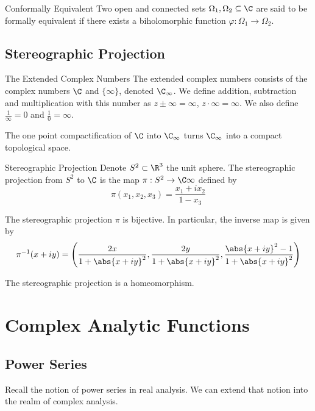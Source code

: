 \documentclass[a4paper]{article}
\begin{document}
\begin{defn}{Conformally Equivalent}{} Two open and connected sets $\Omega_1,\Omega_2\subseteq\C$ are said to be formally equivalent if there exists a biholomorphic function $\varphi:\Omega_1\to\Omega_2$. 
\end{defn}

\subsection{Stereographic Projection}
\begin{defn}{The Extended Complex Numbers}{} The extended complex numbers consists of the complex numbers $\C$ and $\{\infty\}$, denoted $\C_\infty$. We define addition, subtraction and multiplication with this number as $z\pm\infty=\infty$, $z\cdot\infty=\infty$. We also define $\frac{1}{\infty}=0$ and $\frac{1}{0}=\infty$. 
\end{defn}

\begin{thm}{}{} The one point compactification of $\C$ into $\C_\infty$ turns $\C_\infty$ into a compact topological space. 
\end{thm}

\begin{defn}{Stereographic Projection}{} Denote $S^2\subset\R^3$ the unit sphere. The stereographic projection from $S^2$ to $\C$ is the map $\pi:S^2\to\C\infty$ defined by $$\pi(x_1,x_2,x_3)=\frac{x_1+ix_2}{1-x_3}$$
\end{defn}

\begin{prp}{}{} The stereographic projection $\pi$ is bijective. In particular, the inverse map is given by $$\pi^{-1}(x+iy)=\left(\frac{2x}{1+\abs{x+iy}^2},\frac{2y}{1+\abs{x+iy}^2},\frac{\abs{x+iy}^2-1}{1+\abs{x+iy}^2}\right)$$
\end{prp}

\begin{prp}{}{} The stereographic projection is a homeomorphism. 
\end{prp}

\pagebreak
\section{Complex Analytic Functions}
\subsection{Power Series}
Recall the notion of power series in real analysis. We can extend that notion into the realm of complex analysis. 
\end{document}
